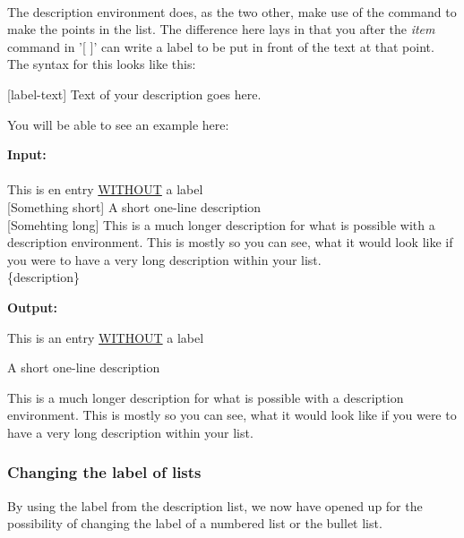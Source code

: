  \\
\indent The description environment does, as the two other, make use of the 
command to make the points in the list. The difference here lays in that you after the 
\textit{item} command in '[ ]' can write a label to be put in front of the text at
that point. \\ 
The syntax for this looks like this:
\begin{center}
    [label-text] Text of your description goes here.
\end{center}

You will be able to see an example here:
\begin{multicols}{2}
    \begin{minipage}{\linewidth}
        \textbf{Input: } \\
         \\
             This is en entry \underline{WITHOUT} a label \\
            [Something short] A short one-line description\\
            [Somehting long] This is a much longer description for what is possible with a description environment. This is mostly so you can see, what it would look like if you were to have a very long description within your list. \\
        \{description\}
    \end{minipage}

    \begin{minipage}{\linewidth}
        \textbf{Output: } \\
        \begin{description}
            \item This is an entry \underline{WITHOUT} a label
            \item[Something short] A short one-line description
            \item[Something long] This is a much longer description for what is possible with a description environment. This is mostly so you can see, what it would look like if you were to have a very long description within your list.    
        \end{description}
    \end{minipage}
\end{multicols}

\subsubsection{Changing the label of lists}
By using the label from the description list, we now have opened up for the 
possibility of changing the label of a numbered list or the bullet list.

